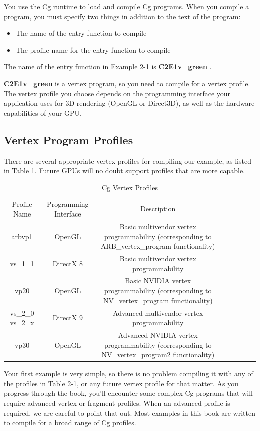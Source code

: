 \documentclass{book}
\begin{document}
You use the Cg runtime to load and compile Cg programs. When you compile a program, you must specify two things in addition to the text of the program:

\FloatBarrier
\begin{itemize}
\item The name of the entry function to compile
\item The profile name for the entry function to compile
\end{itemize}
\FloatBarrier

The name of the entry function in Example 2-1 is \textbf{C2E1v\_green} .

\textbf{C2E1v\_green} is a vertex program, so you need to compile for a vertex profile. The vertex profile you choose depends on the programming interface your application uses for 3D rendering (OpenGL or Direct3D), as well as the hardware capabilities of your GPU.

\subsection{Vertex Program Profiles}

There are several appropriate vertex profiles for compiling our example, as listed in Table \ref{table:2-1}. Future GPUs will no doubt support profiles that are more capable.

\begin{table}
\centering
\begin{tabular}{ |c|c|c|c|c|c|c|c| } 
 \hline
Profile Name & Programming Interface & Description \\
arbvp1 & OpenGL & Basic multivendor vertex programmability (corresponding to ARB\_vertex\_program functionality) \\
vs\_1\_1 & DirectX 8 & Basic multivendor vertex programmability \\
vp20 & OpenGL & Basic NVIDIA vertex programmability (corresponding to NV\_vertex\_program functionality) \\
vs\_2\_0 vs\_2\_x & DirectX 9 & Advanced multivendor vertex programmability \\
vp30 & OpenGL & Advanced NVIDIA vertex programmability (corresponding to NV\_vertex\_program2 functionality) \\
 \hline
\end{tabular}
\caption{Cg Vertex Profiles}
\label{table:2-1}
\end{table}

Your first example is very simple, so there is no problem compiling it with any of the profiles in Table 2-1, or any future vertex profile for that matter. As you progress through the book, you'll encounter some complex Cg programs that will require advanced vertex or fragment profiles. When an advanced profile is required, we are careful to point that out. Most examples in this book are written to compile for a broad range of Cg profiles.
\end{document}
